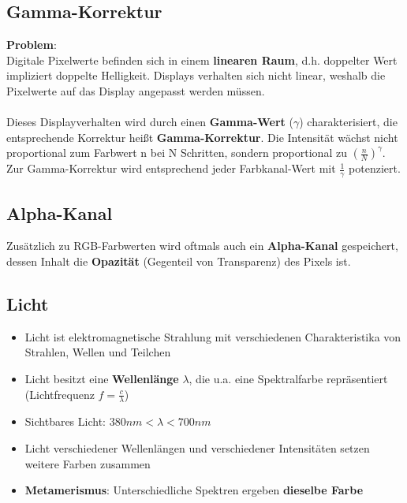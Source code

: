 \documentclass[10pt,a4paper]{article}
\begin{document}
	\subsection{Gamma-Korrektur}
	\label{bfp:sub:gamma_korrektur}

	\textbf{Problem}:\\
	Digitale Pixelwerte befinden sich in einem \textbf{linearen Raum}, d.h. doppelter Wert impliziert doppelte Helligkeit. Displays verhalten sich nicht linear, weshalb die Pixelwerte auf das Display angepasst werden müssen.
	\\\\
	Dieses Displayverhalten wird durch einen \textbf{Gamma-Wert} ($\gamma$) charakterisiert, die entsprechende Korrektur heißt \textbf{Gamma-Korrektur}. Die Intensität wächst nicht proportional zum Farbwert n bei N Schritten, sondern proportional zu $(\frac{n}{N})^{\gamma}$. Zur Gamma-Korrektur wird entsprechend jeder Farbkanal-Wert mit $\frac{1}{\gamma}$ potenziert.

	\subsection{Alpha-Kanal}
	\label{bfp:sub:alpha_kanal}
	
	Zusätzlich zu RGB-Farbwerten wird oftmals auch ein \textbf{Alpha-Kanal} gespeichert, dessen Inhalt die \textbf{Opazität} (Gegenteil von Transparenz) des Pixels ist.

	\subsection{Licht}
	\label{bfp:sub:licht}

	\begin{itemize}
		\item Licht ist elektromagnetische Strahlung mit verschiedenen Charakteristika von Strahlen, Wellen und Teilchen
		\item Licht besitzt eine \textbf{Wellenlänge} $\lambda$, die u.a. eine Spektralfarbe repräsentiert\\(Lichtfrequenz $f = \frac{c}{\lambda}$)
		\item Sichtbares Licht: $380nm < \lambda < 700nm$
		\item Licht verschiedener Wellenlängen und verschiedener Intensitäten setzen weitere Farben zusammen
		\item \textbf{Metamerismus}: Unterschiedliche Spektren ergeben \textbf{dieselbe Farbe}
	\end{itemize}
\end{document}
